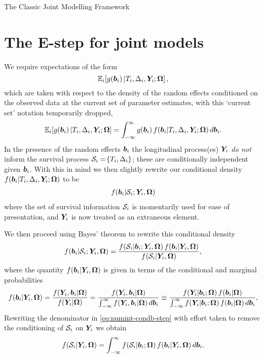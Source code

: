 \begin{chapter}{\label{cha:methods-classic}The Classic Joint Modelling Framework}
  \section{The E-step for joint models}\label{sec:methods-Estepdetails}
  We require expectations of the form 
  \begin{equation*}
      \mathbb{E}_i\!\left[ g\!\left(\bm{b}_i\right)|T_i, \Delta_i, \bm{Y}_i; \bm{\mathrm{\Omega}}\right],
  \end{equation*}
  which are taken with respect to the density of the random effects conditioned on the observed data at the current set of parameter estimates, with this `current set' notation temporarily dropped,
  \begin{equation}
      \mathbb{E}_i\!\left[ g\!\left(\bm{b}_i\right)|T_i, \Delta_i, \bm{Y}_i; \bm{\mathrm{\Omega}}\right]=\int_{-\infty}^\infty g\!\left(\bm{b}_i\right) f\!\left(\bm{b}_i|T_i, \Delta_i, \bm{Y}_i; \bm{\mathrm{\Omega}}\right) d\bm{b}_i.
  \label{eq:numint-target}
  \end{equation}
  In the presence of the random effects $\bm{b}_i$ the longitudinal process(es) $\bm{Y}_i$ \textit{do not} inform the survival process $\mathcal{S}_i=\!\left\{ T_i,\Delta_i\right\}$; these are conditionally independent given $\bm{b}_i$. With this in mind we then slightly rewrite our conditional density $f\!\left(\bm{b}_i|T_i, \Delta_i, \bm{Y}_i; \bm{\mathrm{\Omega}}\right)$ to be
  \begin{align*}
    f\!\left(\bm{b}_i|\mathcal{S}_i;\bm{Y}_i,\bm{\mathrm{\Omega}}\right)
  \end{align*}
  where the set of survival information $\mathcal{S}_i$ is momentarily used for ease of presentation, and $\bm{Y}_i$ is now treated as an extraneous element.

  We then proceed using Bayes' theorem to rewrite this conditional density 
  \begin{align}
    f\!\left(\bm{b}_i|\mathcal{S}_i;\bm{Y}_i,\bm{\mathrm{\Omega}}\right)=\frac{f\!\left(\mathcal{S}_i|\bm{b}_i;\bm{Y}_i,\bm{\mathrm{\Omega}}\right) f\!\left(\bm{b}_i|\bm{Y}_i,\bm{\mathrm{\Omega}}\right)}{f\!\left(\mathcal{S}_i|\bm{Y}_i,\bm{\mathrm{\Omega}}\right)},
  \label{eq:numint-condb-step}
  \end{align}
  where the quantity $f\!\left(\bm{b}_i|\bm{Y}_i,\bm{\mathrm{\Omega}}\right)$ is given in terms of the conditional and marginal probabilities
  \begin{align}
    f\lb\b|\Y,\bO\rb=\frac{f\lb\Y,\b|\bO\rb}{f\lb\Y|\bO\rb}=\frac{f\lb\Y,\b|\bO\rb}{\int_{-\infty}^\infty f\lb\Y,\b|\bO\rb d\b}\equiv
    \frac{f\lb\Y|\b;\bO\rb f\lb\b|\bO\rb}{\int_{-\infty}^\infty f\lb\Y|\b;\bO\rb f\lb\b|\bO\rb d\b},
  \label{eq:numint-problem}
  \end{align}
  Rewriting the denominator in \eqref{eq:numint-condb-step} with effort taken to remove the conditioning of $\mathcal{S}_i$ on $\bm{Y}_i$ we obtain
  \begin{align*}
    f\!\left(\mathcal{S}_i|\bm{Y}_i,\bm{\mathrm{\Omega}}\right)=\int_{-\infty}^\infty f\!\left(\mathcal{S}_i|\bm{b}_i;\bm{\mathrm{\Omega}}\right) f\!\left(\bm{b}_i|\bm{Y}_i,\bm{\mathrm{\Omega}}\right) d\bm{b}_i.
  \end{align*}


\end{chapter}
